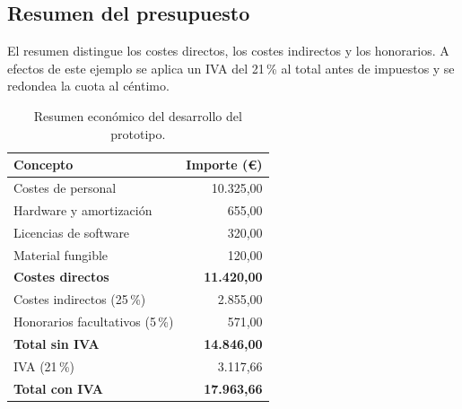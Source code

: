 \begin{samepage}
  \section{Resumen del presupuesto}
  \label{sec:presupuesto-total}

  El resumen distingue los costes directos, los costes indirectos y los
  honorarios. A efectos de este ejemplo se aplica un IVA del 21\,\% al
  total antes de impuestos y se redondea la cuota al céntimo.

  \nopagebreak
  \begin{table}[H]
    \caption{Resumen económico del desarrollo del prototipo.}
    \label{tab:presupuesto_total}
    \begin{tabularx}{\linewidth}{@{}>{\raggedright\arraybackslash}X r@{}}
      \hline
      \textbf{Concepto}               & \textbf{Importe (€)} \\
      \hline
      Costes de personal              &            10.325,00 \\
      Hardware y amortización         &               655,00 \\
      Licencias de software           &               320,00 \\
      Material fungible               &               120,00 \\
      \hline
      \textbf{Costes directos}        &   \textbf{11.420,00} \\
      Costes indirectos (25\,\%)      &             2.855,00 \\
      Honorarios facultativos (5\,\%) &               571,00 \\
      \hline
      \textbf{Total sin IVA}          &   \textbf{14.846,00} \\
      IVA (21\,\%)                    &             3.117,66 \\
      \hline
      \textbf{Total con IVA}          &   \textbf{17.963,66} \\
      \hline
    \end{tabularx}
  \end{table}
\end{samepage}

